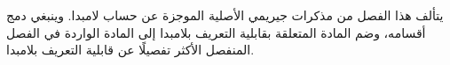 \documentclass[../../../include/open-logic-chapter]{subfiles}
\begin{document}

\begin{editorial}
يتألف هذا الفصل من مذكرات جيريمي الأصلية الموجزة عن حساب لامبدا. وينبغي
دمج أقسامه، وضم المادة المتعلقة بقابلية التعريف بلامبدا إلى المادة
الواردة في الفصل المنفصل الأكثر تفصيلًا عن قابلية التعريف بلامبدا.
\end{editorial}














\OLEndChapterHook
\end{document}
